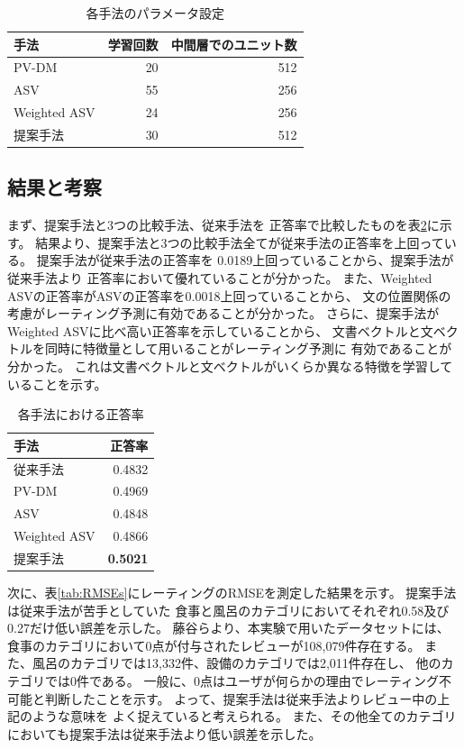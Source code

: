 \documentclass[twocolumn,a4paper]{ltjarticle}
\begin{document}
\begin{table}[b!]
  \caption{各手法のパラメータ設定}
  \centering
  \begin{tabular}{l | r r} \label{tab:ParametersOfMethods}
    手法 & 学習回数 & 中間層でのユニット数 \\
    \hline
    PV-DM & 20 & 512 \\
    ASV & 55 & 256 \\
    Weighted ASV & 24 & 256 \\
    提案手法 & 30 & 512 \\
  \end{tabular}
\end{table}


\subsection{結果と考察}

まず、提案手法と3つの比較手法、従来手法\cite{fujitani15}を
正答率で比較したものを表\ref{tab:Accuracies}に示す。
結果より、提案手法と3つの比較手法全てが従来手法の正答率を上回っている。
提案手法が従来手法\cite{fujitani15}の正答率を
0.0189上回っていることから、提案手法が従来手法\cite{fujitani15}より
正答率において優れていることが分かった。
また、Weighted ASVの正答率がASVの正答率を0.0018上回っていることから、
文の位置関係の考慮がレーティング予測に有効であることが分かった。
さらに、提案手法がWeighted ASVに比べ高い正答率を示していることから、
文書ベクトルと文ベクトルを同時に特徴量として用いることがレーティング予測に
有効であることが分かった。
これは文書ベクトルと文ベクトルがいくらか異なる特徴を学習していることを示す。

\begin{table}[b!]
  \caption{各手法における正答率}
  \centering
  \begin{tabular}{l | r} \label{tab:Accuracies}
    手法 & 正答率 \\
    \hline
    従来手法\cite{fujitani15}  & 0.4832 \\
    PV-DM & 0.4969 \\
    ASV & 0.4848 \\
    Weighted ASV & 0.4866 \\
    提案手法 & \textbf{0.5021} \\
  \end{tabular}
\end{table}

次に、表\ref{tab:RMSEs}にレーティングのRMSEを測定した結果を示す。
提案手法は従来手法\cite{fujitani15}が苦手としていた
食事と風呂のカテゴリにおいてそれぞれ0.58及び0.27だけ低い誤差を示した。
藤谷ら\cite{fujitani15}より、本実験で用いたデータセットには、
食事のカテゴリにおいて0点が付与されたレビューが108,079件存在する。
また、風呂のカテゴリでは13,332件、設備のカテゴリでは2,011件存在し、
他のカテゴリでは0件である。
一般に、0点はユーザが何らかの理由でレーティング不可能と判断したことを示す。
よって、提案手法は従来手法\cite{fujitani15}よりレビュー中の上記のような意味を
よく捉えていると考えられる。
また、その他全てのカテゴリにおいても提案手法は従来手法より低い誤差を示した。
\end{document}
